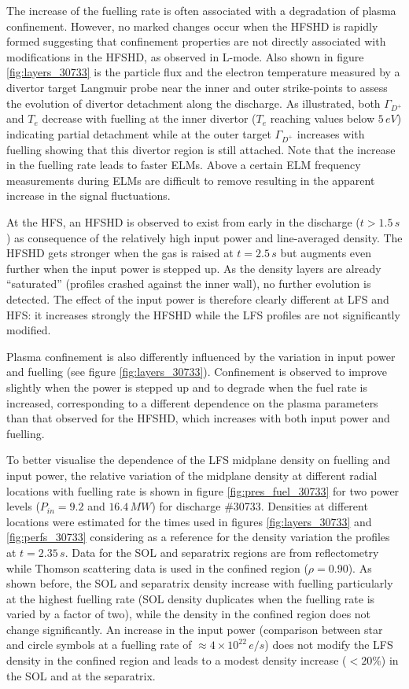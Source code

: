 \documentclass[12pt]{iopart}
\begin{document}
The increase of the fuelling rate is often associated with a degradation of plasma confinement. However, no marked changes occur when the HFSHD is rapidly formed suggesting that confinement properties are not directly associated with modifications in the HFSHD, as observed in L-mode\cite{guimarais2017poloidal}. Also shown in figure \ref{fig:layers_30733} is the particle flux and the electron temperature measured by a divertor target Langmuir probe near the inner and outer strike-points to assess the evolution of divertor detachment along the discharge. As illustrated, both $\Gamma_{D^{+}}$ and $T_e$ decrease with fuelling at the inner divertor ($T_e$ reaching values below $5\,eV$) indicating partial detachment while at the outer target $\Gamma_{D^{+}}$ increases with fuelling showing that this divertor region is still attached. Note that the increase in the fuelling rate leads to faster ELMs. Above a certain ELM frequency measurements during ELMs are difficult to remove resulting in the apparent increase in the signal fluctuations. 

At the HFS, an HFSHD is observed to exist from  early in the discharge ($t > 1.5\,s$) as consequence of the relatively high input power and line-averaged density. The HFSHD gets stronger when the gas is raised at $t = 2.5\,s$ but augments even further when the input power is stepped up. As the density layers are already “saturated” (profiles crashed against the inner wall), no further evolution is detected. The effect of the input power is therefore clearly different at LFS and HFS: it increases strongly the HFSHD while the LFS profiles are not significantly modified.

Plasma confinement is also differently influenced by the variation in input power and fuelling (see figure \ref{fig:layers_30733}). Confinement is observed to improve slightly when the power is stepped up and to degrade when the fuel rate is increased, corresponding to a different dependence on the plasma parameters than that observed for the HFSHD, which increases with both input power and fuelling.

To better visualise the dependence of the LFS midplane density on fuelling and input power, the relative variation of the midplane density at different radial locations with fuelling rate is shown in figure \ref{fig:pres_fuel_30733} for two power levels ($P_{in}=9.2$ and $16.4\,MW$) for discharge \#30733. Densities at different locations were estimated for the times used in  figures \ref{fig:layers_30733} and \ref{fig:perfs_30733} considering as a reference for the density variation the profiles at $t=2.35\,s$. Data for the SOL and separatrix regions are from reflectometry while Thomson scattering data is used in the confined region ($\rho=0.90$). As shown before, the SOL and separatrix density increase with fuelling particularly at the highest fuelling rate (SOL density duplicates when the fuelling rate is varied by a factor of two), while the density in the confined region does not change significantly. An increase in the input power (comparison between star and circle symbols at a fuelling rate of $\approx 4\times10^{22}\,e/s$) does not modify the LFS density in the confined region and leads to a modest density increase ($<20\%$) in the SOL and at the separatrix. 
\end{document}
